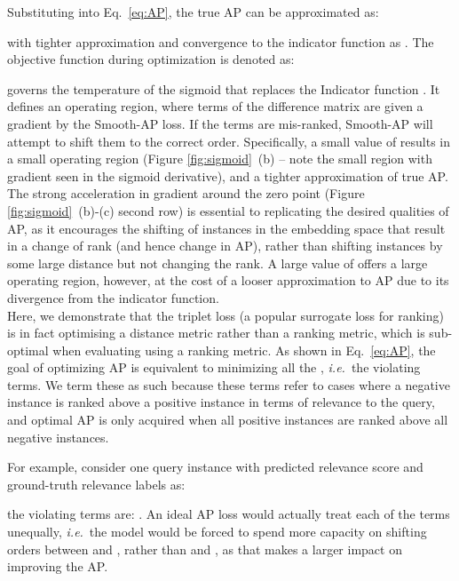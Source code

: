 \documentclass[runningheads]{llncs}
\providecommand{\ie}[0]{\emph{i.e.}}
\begin{document}
Substituting  into Eq.~\ref{eq:AP}, the true AP can be approximated as:

\noindent with tighter approximation and convergence to the indicator function as .
The objective function during optimization is denoted as:
\begingroup\abovedisplayskip=7pt \belowdisplayskip=7pt

\endgroup

governs the temperature of the sigmoid that replaces the Indicator function . 
It defines an operating region, where terms of the difference matrix are given a gradient by the Smooth-AP loss. 
If the terms are mis-ranked, Smooth-AP will attempt to shift them to the correct order. 
Specifically, a small value of  results in a small operating region (Figure \ref{fig:sigmoid}~(b) -- note the small region with gradient seen in the sigmoid derivative), and a tighter approximation of true AP. 
The strong acceleration in gradient around the zero point (Figure \ref{fig:sigmoid}~(b)-(c) second row) is essential to replicating the desired qualities of AP, 
as it encourages the shifting of instances in the embedding space that result in a change of rank (and hence change in AP), 
rather than shifting instances by some large distance but not changing the rank. 
A large value of  offers a large operating region, 
however, at the cost of a looser approximation to AP due to its divergence from the indicator function.\\

\label{relation_triplet}
Here, we demonstrate that the triplet loss (a popular surrogate loss for ranking) is in fact optimising a distance metric rather than a ranking metric, which is sub-optimal when evaluating using a ranking metric.
As shown in Eq.~\ref{eq:AP}, 
the goal of optimizing AP is equivalent to minimizing all the , \ie~the violating terms. 
We term these as such because these terms refer to cases 
where a negative instance is ranked above a positive instance in terms of relevance to the query, 
and optimal AP is only acquired when all positive instances are ranked above all negative instances. 

For example, 
consider one query instance with predicted relevance score and ground-truth relevance labels as:


\noindent the violating terms are: 
.
An ideal AP loss would actually treat each of the terms unequally, 
\ie~the model would be forced to spend more capacity on shifting orders between  and , 
rather than  and , as that makes a larger impact on improving the AP.\\
\end{document}

